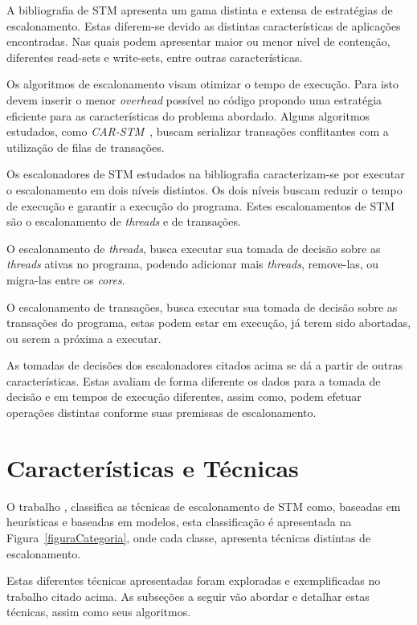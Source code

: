 \documentclass[ti]{texufpel}
\begin{document}
  A bibliografia de STM apresenta um gama distinta e extensa de estratégias de escalonamento. Estas diferem-se devido as distintas características de aplicações encontradas. Nas quais podem apresentar maior ou menor nível de contenção, diferentes read-sets e write-sets, entre outras características.

  Os algoritmos de escalonamento visam otimizar o tempo de execução. Para isto devem inserir o menor \emph{overhead} possível no código propondo uma estratégia eficiente para as características do problema abordado. Alguns algoritmos estudados, como \emph{CAR-STM}~\cite{dolev08}, buscam serializar transações conflitantes com a utilização de filas de transações.

  Os escalonadores de STM estudados na bibliografia caracterizam-se por executar o escalonamento em dois níveis distintos. Os dois níveis buscam reduzir o tempo de execução e garantir a execução do programa. Estes escalonamentos de STM são o escalonamento de \emph{threads} e de transações.

  O escalonamento de \emph{threads}, busca executar sua tomada de decisão sobre as \emph{threads} ativas no programa, podendo adicionar mais \emph{threads}, remove-las, ou migra-las entre os \emph{cores}.

  O escalonamento de transações, busca executar sua tomada de decisão sobre as transações do programa, estas podem estar em execução, já terem sido abortadas, ou serem a próxima a executar.

  As tomadas de decisões dos escalonadores citados acima se dá a partir de outras características. Estas avaliam de forma diferente os dados para a tomada de decisão e em tempos de execução diferentes, assim como, podem efetuar operações distintas conforme suas premissas de escalonamento.

\section{Características e Técnicas}

O trabalho \cite{sanzo17}, classifica as técnicas de escalonamento de STM como, baseadas em heurísticas e baseadas em modelos, esta classificação é apresentada na Figura~\ref{figuraCategoria}, onde cada classe, apresenta técnicas distintas de escalonamento.

Estas diferentes técnicas apresentadas foram exploradas e exemplificadas no trabalho citado acima. As subseções a seguir vão abordar e detalhar estas técnicas, assim como seus algoritmos.
\end{document}
